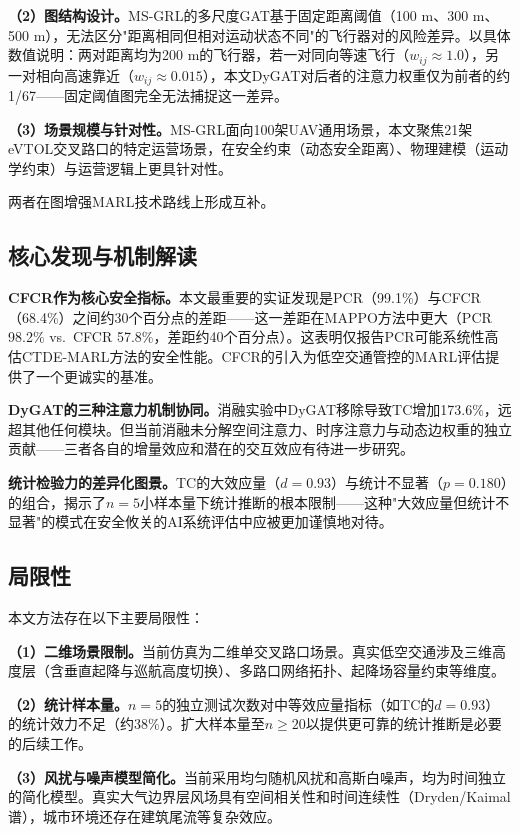 \documentclass[12pt,a4paper,UTF8]{ctexart}
\begin{document}
\textbf{（2）图结构设计。}MS-GRL的多尺度GAT基于固定距离阈值（100 m、300 m、500 m），无法区分"距离相同但相对运动状态不同"的飞行器对的风险差异。以具体数值说明：两对距离均为200 m的飞行器，若一对同向等速飞行（$w_{ij} \approx 1.0$），另一对相向高速靠近（$w_{ij} \approx 0.015$），本文DyGAT对后者的注意力权重仅为前者的约1/67——固定阈值图完全无法捕捉这一差异。

\textbf{（3）场景规模与针对性。}MS-GRL面向100架UAV通用场景，本文聚焦21架eVTOL交叉路口的特定运营场景，在安全约束（动态安全距离）、物理建模（运动学约束）与运营逻辑上更具针对性。

两者在图增强MARL技术路线上形成互补。

\subsection{核心发现与机制解读}

\textbf{CFCR作为核心安全指标。}本文最重要的实证发现是PCR（99.1\%）与CFCR（68.4\%）之间约30个百分点的差距——这一差距在MAPPO方法中更大（PCR 98.2\% vs.\ CFCR 57.8\%，差距约40个百分点）。这表明仅报告PCR可能系统性高估CTDE-MARL方法的安全性能。CFCR的引入为低空交通管控的MARL评估提供了一个更诚实的基准。

\textbf{DyGAT的三种注意力机制协同。}消融实验中DyGAT移除导致TC增加173.6\%，远超其他任何模块。但当前消融未分解空间注意力、时序注意力与动态边权重的独立贡献——三者各自的增量效应和潜在的交互效应有待进一步研究。

\textbf{统计检验力的差异化图景。}TC的大效应量（$d=0.93$）与统计不显著（$p=0.180$）的组合，揭示了$n=5$小样本量下统计推断的根本限制——这种"大效应量但统计不显著"的模式在安全攸关的AI系统评估中应被更加谨慎地对待。

\subsection{局限性}

本文方法存在以下主要局限性：

\textbf{（1）二维场景限制。}当前仿真为二维单交叉路口场景。真实低空交通涉及三维高度层（含垂直起降与巡航高度切换）、多路口网络拓扑、起降场容量约束等维度。

\textbf{（2）统计样本量。}$n=5$的独立测试次数对中等效应量指标（如TC的$d=0.93$）的统计效力不足（约38\%）。扩大样本量至$n \geq 20$以提供更可靠的统计推断是必要的后续工作。

\textbf{（3）风扰与噪声模型简化。}当前采用均匀随机风扰和高斯白噪声，均为时间独立的简化模型。真实大气边界层风场具有空间相关性和时间连续性（Dryden/Kaimal谱），城市环境还存在建筑尾流等复杂效应。
\end{document}
